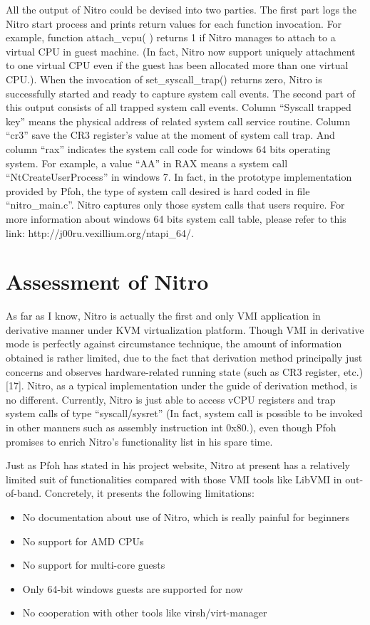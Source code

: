 All the output of Nitro could be devised into two parties. 
The first part logs the Nitro start process and prints return values for each function invocation. 
For example, function attach\_vcpu( ) returns 1 if Nitro manages to attach to a virtual CPU in guest machine.
(In fact, Nitro now support uniquely attachment to one virtual CPU even if the guest has been allocated more than one virtual CPU.). 
When the invocation of set\_syscall\_trap() returns zero, Nitro is successfully started and ready to capture system call events.
The second part of this output consists of all trapped system call events. Column “Syscall trapped key” means the physical address of 
related system call service routine. Column “cr3” save the CR3 register’s value at the moment of system call trap. And column “rax” 
indicates the system call code for windows 64 bits operating system. For example, a value “AA” in RAX means a system call 
“NtCreateUserProcess” in windows 7. In fact, in the prototype implementation provided by Pfoh, the type of system call desired is 
hard coded in file “nitro\_main.c”. Nitro captures only those system calls that users require.  
For more information about windows 64 bits system call table, please refer to this link: http://j00ru.vexillium.org/ntapi\_64/.

\section{Assessment of Nitro}
As far as I know, Nitro is actually the first and only VMI application in derivative manner under KVM virtualization platform. 
Though VMI in derivative mode is perfectly against circumstance technique, the amount of information obtained is rather limited, 
due to the fact that derivation method principally just concerns and observes hardware-related running state (such as CR3 register, etc.)
[17]. Nitro, as a typical implementation under the guide of derivation method, is no different. Currently, Nitro is just able to access vCPU 
registers and trap system calls of type “syscall/sysret” (In fact, system call is possible to be invoked in other manners such as assembly instruction int 0x80.), 
even though Pfoh promises to enrich Nitro’s functionality list in his spare time.

Just as Pfoh has stated in his project website, Nitro at present has a relatively limited suit of functionalities compared with 
those VMI tools like LibVMI in out-of-band. Concretely, it presents the following limitations:
\begin{itemize}
    \item No documentation about use of Nitro, which is really painful for beginners
    \item No support for AMD CPUs
    \item No support for multi-core guests
    \item Only 64-bit windows guests are supported for now
    \item No cooperation with other tools like virsh/virt-manager
\end{itemize}

